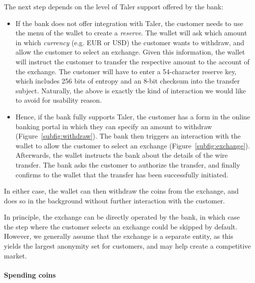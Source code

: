 \documentclass{llncs}
\begin{document}
The next step depends on the level of Taler support offered by the bank:
\begin{itemize}
\item If the bank does not offer integration with Taler, the
  customer needs to use the menu of the wallet to create a {\em reserve}.
  The wallet will ask which amount in which {\em currency} (e.g. EUR
  or USD) the customer wants to withdraw, and allow the customer to
  select an exchange.  Given this information, the wallet will
  instruct the customer to transfer the respective amount to the
  account of the exchange.  The customer will have to enter a
  54-character reserve key, which includes 256 bits of entropy and an
  8-bit checksum into the transfer subject.  Naturally, the above is
  exactly the kind of interaction we would like to avoid for
  usability reason.
\item Hence, if the bank fully supports Taler, the
  customer has a form in the online banking portal in which they can specify
  an amount to withdraw (Figure~\ref{subfig:withdraw}).
  The bank then triggers an interaction with
  the wallet to allow the customer to select an exchange
  (Figure~\ref{subfig:exchange}).  Afterwards,
  the wallet instructs the bank about the details of the wire
  transfer.  The bank asks the customer to authorize the transfer, and
  finally confirms to the wallet that the transfer has been
  successfully initiated.
\end{itemize}

In either case, the wallet can then withdraw the coins from the
exchange, and does so in the background without further interaction
with the customer.

In principle, the exchange can be directly operated by the bank, in
which case the step where the customer selects an exchange could be
skipped by default.  However, we generally assume that the exchange is
a separate entity, as this yields the largest anonymity set for
customers, and may help create a competitive market.

\paragraph{Spending coins}
\end{document}
